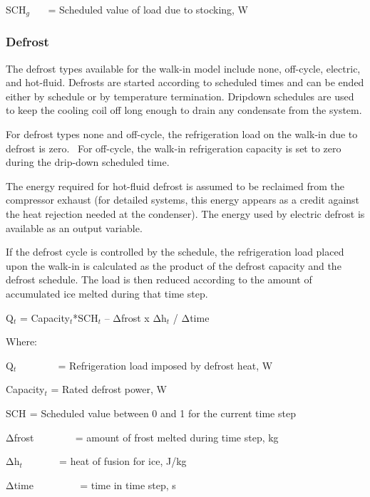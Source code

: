 SCH\(_{g}\)~~~ = Scheduled value of load due to stocking, W

\subsubsection{Defrost}\label{defrost}

The defrost types available for the walk-in model include none, off-cycle, electric, and hot-fluid. Defrosts are started according to scheduled times and can be ended either by schedule or by temperature termination. Dripdown schedules are used to keep the cooling coil off long enough to drain any condensate from the system.

For defrost types none and off-cycle, the refrigeration load on the walk-in due to defrost is zero.~ For off-cycle, the walk-in refrigeration capacity is set to zero during the drip-down scheduled time.

The energy required for hot-fluid defrost is assumed to be reclaimed from the compressor exhaust (for detailed systems, this energy appears as a credit against the heat rejection needed at the condenser). The energy used by electric defrost is available as an output variable.

If the defrost cycle is controlled by the schedule, the refrigeration load placed upon the walk-in is calculated as the product of the defrost capacity and the defrost schedule. The load is then reduced according to the amount of accumulated ice melted during that time step.

Q\(_{t}\) = Capacity\(_{t}\)*SCH\(_{t}\) -- Δfrost x Δh\(_{t}\) / Δtime

Where:

Q\(_{t}\) ~~~~~~~ = Refrigeration load imposed by defrost heat, W

Capacity\(_{t}\) = Rated defrost power, W

SCH\(_{ }\) = Scheduled value between 0 and 1 for the current time step

Δfrost ~~~~~~~ = amount of frost melted during time step, kg

Δh\(_{t}\) ~~~~~~ = heat of fusion for ice, J/kg

Δtime ~~~~~~~~ = time in time step, s

